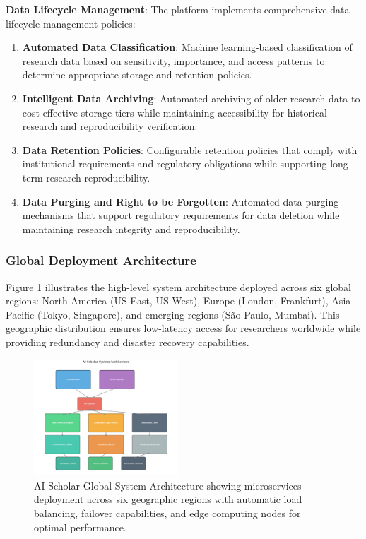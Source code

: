 \documentclass[10pt,twocolumn]{article}
\begin{document}
\textbf{Data Lifecycle Management}: The platform implements comprehensive data lifecycle management policies:

\begin{enumerate}
    \item \textbf{Automated Data Classification}: Machine learning-based classification of research data based on sensitivity, importance, and access patterns to determine appropriate storage and retention policies.
    
    \item \textbf{Intelligent Data Archiving}: Automated archiving of older research data to cost-effective storage tiers while maintaining accessibility for historical research and reproducibility verification.
    
    \item \textbf{Data Retention Policies}: Configurable retention policies that comply with institutional requirements and regulatory obligations while supporting long-term research reproducibility.
    
    \item \textbf{Data Purging and Right to be Forgotten}: Automated data purging mechanisms that support regulatory requirements for data deletion while maintaining research integrity and reproducibility.
\end{enumerate}

\subsubsection{Global Deployment Architecture}

Figure \ref{fig:architecture} illustrates the high-level system architecture deployed across six global regions: North America (US East, US West), Europe (London, Frankfurt), Asia-Pacific (Tokyo, Singapore), and emerging regions (São Paulo, Mumbai). This geographic distribution ensures low-latency access for researchers worldwide while providing redundancy and disaster recovery capabilities.

\begin{figure}[t]
\centering
\includegraphics[width=0.48\textwidth]{figures/system_architecture.png}
\caption{AI Scholar Global System Architecture showing microservices deployment across six geographic regions with automatic load balancing, failover capabilities, and edge computing nodes for optimal performance.}
\label{fig:architecture}
\end{figure}
\end{document}
